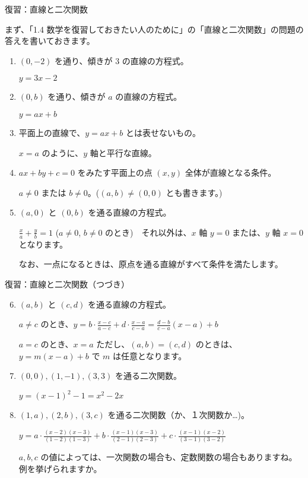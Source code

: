 \documentclass[10pt, dvipdfmx]{beamer}
\begin{document}
\begin{frame}{復習：直線と二次関数}

まず、「1.4 数学を復習しておきたい人のために」の「直線と二次関数」の問題の答えを書いておきます。

\begin{enumerate}
\item \((0,-2)\) を通り、傾きが 3 の直線の方程式。\par
 \(y = 3x-2\)
\item \((0,b)\) を通り、傾きが \(a\) の直線の方程式。\par
 \(y = ax+b\)
\item 平面上の直線で、\(y = ax+b\) とは表せないもの。\par
\(x = a\) のように、\(y\) 軸と平行な直線。
\item \(ax + by + c = 0\) をみたす平面上の点 \((x,y)\) 全体が直線となる条件。\par
 \(a\neq 0\) または \(b\neq 0\)。(\((a,b)\neq (0,0)\) とも書きます。)\par
\item \((a,0)\) と \((0,b)\) を通る直線の方程式。\par
 \({\displaystyle \frac{x}{a} + \frac{y}{b} = 1}\) (\(a\neq 0\), \(b\neq 0\) のとき)　それ以外は、\(x\) 軸 \(y=0\) または、\(y\) 軸 \(x=0\) となります。\par
なお、一点になるときは、原点を通る直線がすべて条件を満たします。
\end{enumerate}
\end{frame}
\begin{frame}{復習：直線と二次関数（つづき）}
\begin{enumerate}
\setcounter{enumi}{5}
\item \((a,b)\) と \((c,d)\) を通る直線の方程式。\par
 \(a\neq c\) のとき、\({\displaystyle y = b\cdot \frac{x-c}{a-c} + d\cdot \frac{x-a}{c-a} = \frac{d-b}{c-a}(x-a) + b}\)\par
 \(a = c\) のとき、\(x=a\) ただし、\((a,b) = (c,d)\) のときは、\(y = m(x-a) + b\) で \(m\) は任意となります。
\item \((0,0), (1,-1), (3,3)\) を通る二次関数。\par
 \(y = (x-1)^2 -1 = x^2 -2x\)
\item \((1,a), (2,b), (3,c)\) を通る二次関数（か、１次関数か…)。\par
\({\displaystyle y = a\cdot \frac{(x-2)(x-3)}{(1-2)(1-3)} + b\cdot\frac{(x-1)(x-3)}{(2-1)(2-3)} + c\cdot\frac{(x-1)(x-2)}{(3-1)(3-2)}}\)\par
 \(a, b, c\) の値によっては、一次関数の場合も、定数関数の場合もありますね。例を挙げられますか。
\end{enumerate}
\end{frame}
\end{document}
